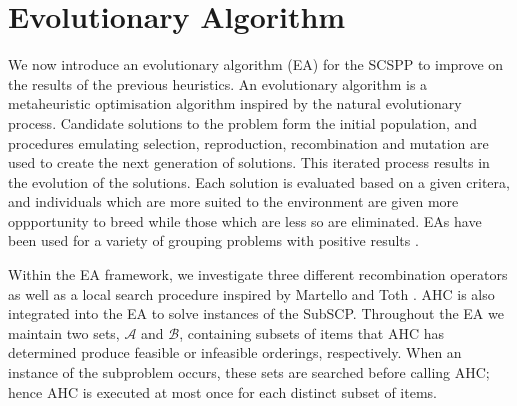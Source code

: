 \documentclass{elsarticle}
\begin{document}
\section{Evolutionary Algorithm}
\label{sec:ea}
\noindent We now introduce an evolutionary algorithm (EA) for the SCSPP to improve on the results of the previous heuristics. An evolutionary algorithm is a metaheuristic optimisation algorithm inspired by the natural evolutionary process. Candidate solutions to the problem form the initial population, and procedures emulating selection, reproduction, recombination and mutation are used to create the next generation of solutions. This iterated process results in the evolution of the solutions. Each solution is evaluated based on a given critera, and individuals which are more suited to the environment are given more oppportunity to breed while those which are less so are eliminated. EAs have been used for a variety of grouping problems with positive results \cite{lewis2017, falkenauer1996, quiroz2015}. 

Within the EA framework, we investigate three different recombination operators as well as a local search procedure inspired by Martello and Toth \cite{martello1990l}. AHC is also integrated into the EA to solve instances of the SubSCP. Throughout the EA we maintain two sets, $\mathcal{A}$ and $\mathcal{B}$, containing subsets of items that AHC has determined produce feasible or infeasible orderings, respectively. When an instance of the subproblem occurs, these sets are searched before calling AHC; hence AHC is executed at most once for each distinct subset of items.

\begin{comment}
{\color{myRed}
\begin{itemize}[leftmargin=*]
	\item
	\idone{Why use an EA? Lit review of EAs in BPP problems, benefits (repeated multiple times, best characteristics of strips/solutions).}
	\idone{Whenever subproblem occurs, AHC will be used.}
	\idone{Sets $\mathcal{A}$ and $\mathcal{B}$, subsets of items that produce feasible/infeasible orderings determined by AHC. Search these sets before calling AHC, therefore AHC used at most once for each distinct subset of items $\mathcal{I}' \subseteq \mathcal{I}$.}
	\idone{Feasible solution $\mathcal{S}$ means solution abides by all constraints.}
\end{itemize}
}
\end{comment}
\end{document}
